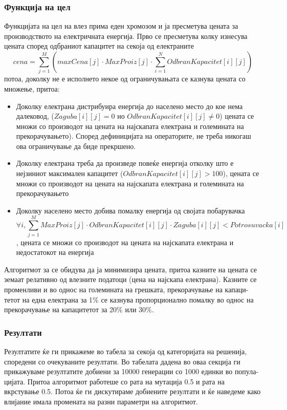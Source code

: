 \documentclass{article}
\begin{document}
\subsubsection{Функција на цел}

Функцијата на цел на влез прима еден хромозом и ја пресметува цената за производството на електричната енергија. Прво се пресметува колку изнесува цената според одбраниот капацитет на секоја од електраните 
\[ cena = \sum_{j=1}^{M} (maxCena[j] \cdot MaxProiz[j] \cdot  \sum_{i=1}^{N} OdbranKapacitet[i][j] )\]
потоа, доколку не е исполнето некое од ограничувањата се казнува цената со множење, притоа:
\begin{itemize}
\item Доколку електрана дистрибуира енергија до населено место до кое нема далековод, ($Zaguba[i][j] = 0$ но $OdbranKapacitet[i][j] \neq 0$) цената се множи со производот на цената на најскапата електрана и големината на прекорачувањето). Според дефиницијата на операторите, не треба никогаш ова ограничување да биде прекршено.  
\item Доколку електрана треба да произведе повеќе енергија отколку што е нејзиниот максимален капацитет ($OdbranKapacitet[i][j] > 100$), цената се множи со производот на цената на најскапата електрана и големината на прекорачувањето 
\item Доколку населено место добива помалку енергија од својата побарувачка 
\[ \forall i, \sum_{j=1}^{M} MaxProiz[j] \cdot OdbranKapacitet[i][j] \cdot Zaguba[i][j] < Potrosuvacka[i] \], цената се множи со производот на цената на најскапата електрана и недостатокот на енергија 
\end{itemize}

Алгоритмот за се обидува да ја минимизира цената, притоа казните на цената се земаат релативно од влезните податоци (цена на најскапа електрана). Казните се променливи и во однос на големината на грешката, прекорачување на капаци-тетот на една електрана за 1\% се казнува пропорционално помалку во однос на прекорачување на капацитетот за 20\% или 30\%.

\subsubsection{Резултати}
 
Резултатите ќе ги прикажеме во табела за секоја од категоријата на решенија, споредени со очекуваните резултати. Во табелата дадена во оваа секција ги прикажуваме резултатите добиени за 10000 генерации со 1000 единки во попула-цијата. Притоа алгоритмот работеше со рата на мутација 0.5 и рата на вкрстување 0.5. Потоа ќе ги дискутираме добиените резултати и ќе наведеме како влијание имала промената на разни параметри на алгоритмот. 
\end{document}
